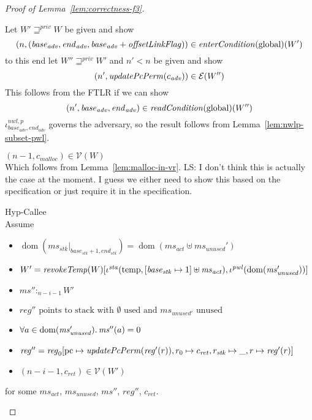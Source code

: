 \documentclass[a4paper]{article}
\DeclareMathOperator{\dom}{dom}
\newcommand\lau[1]{{\color{purple} \sf \footnotesize {LS: #1}}\\}
\newcommand{\var}[1]{\mathit{#1}}
\newcommand{\hs}{\var{ms}}
\newcommand{\ms}{\hs}
\newcommand{\pcreg}{\mathrm{pc}}
\newcommand{\start}{\var{base}}
\newcommand{\addrend}{\var{end}}
\newcommand{\reg}{\var{reg}}
\newcommand{\heap}{\var{mem}}
\newcommand{\adv}{\var{adv}}
\newcommand{\stk}{\var{stk}}
\newcommand{\nwl}{\var{nwl}}
\newcommand{\pwl}{\var{pwl}}
\newcommand{\sta}{\var{sta}}
\newcommand{\olf}{\var{offsetLinkFlag}}
\newcommand{\plainfun}[2]{
  \ifthenelse{\equal{#2}{}}
  {\mathit{#1}}
  {\mathit{#1}(#2)}
}
\newcommand{\updatePcPerm}[1]{\plainfun{updatePcPerm}{#1}}
\newcommand{\readCond}[1]{\plainfun{readCondition}{#1}}
\newcommand{\entryCond}[1]{\plainfun{enterCondition}{#1}}
\newcommand{\revokeTemp}[1]{\plainfun{revokeTemp}{#1}}
\newcommand{\futurestr}{\mathbin{\sqsupseteq}^{\var{priv}}}
\newcommand{\heapSat}[3][\heap]{#1 :_{#2} #3}
\newcommand{\memSat}[3][n]{\heapSat[#2]{#1}{#3}}
\newcommand{\codelabel}[1]{\mathit{#1}}
\newcommand{\malloc}{\codelabel{malloc}}
\newcommand{\asmType}{\plaindom{AsmType}}
\newcommand{\plaindom}[1]{\mathrm{#1}}
\newcommand{\intr}[2]{\mathcal{#1}}
\newcommand{\valueintr}[1]{\intr{V}{#1}}
\newcommand{\exprintr}[1]{\intr{E}{#1}}
\newcommand{\stdvr}{\valueintr{\asmType}}
\newcommand{\stder}{\exprintr{\asmType}}
\newcommand{\npair}[2][n]{\left(#1,#2 \right)}
\newcommand{\plainperm}[1]{\mathrm{#1}}
\newcommand{\glob}{\plainperm{global}}
\newcommand{\plainview}[1]{\mathrm{#1}}
\newcommand{\temp}{\plainview{temp}}
\begin{document}
\begin{proof}[Proof of Lemma~\ref{lem:correctness-f3}]
\begin{enumproof}
\begin{enumproof}
\begin{enumproof}
            Let $W' \futurestr W$ be given and show
            \[
              \npair{(\start_\adv,\addrend_\adv,\start_\adv+\olf)} \in \entryCond{}(\glob)(W')
            \]
            to this end let $W'' \futurestr W'$ and $n' < n$ be given and show
            \[
              \npair[n']{\updatePcPerm{c_\adv}} \in \stder(W'')
            \]
            This follows from the FTLR if we can show
            \[
              \npair[n']{\start_\adv,\addrend_\adv} \in \readCond{}(\glob)(W'')
            \]
            $\iota^{\nwl,p}_{\start_\adv,\addrend_\adv}$ governs the adversary, so the result follows from Lemma~\ref{lem:nwlp-subset-pwl}.
          \item $\npair[n-1]{c_\malloc} \in \stdvr(W)$\\
            Which follows from Lemma~\ref{lem:malloc-in-vr}.
            \lau{I don't think this is actually the case at the moment. I guess we either need to show this based on the specification or just require it in the specification.}
        \end{enumproof}
    \end{enumproof}
  \item Hyp-Callee\\
    Assume
    \begin{itemize}
    \item $\dom(\ms_\stk |_{\start_\stk+1,\addrend_\stk}) = \dom(\ms_{\mathit{act}} \uplus \ms_{\mathit{unused}}')$
    \item $W' = \revokeTemp{W}[\iota^{\sta}(\temp,[\start_\stk \mapsto 1]\uplus\ms_{\mathit{act}}),\iota^{\pwl}(\dom(\ms_{\mathit{unused}}'))]$
    \item $\memSat[n-i-1]{\ms''}{W'}$
    \item $\reg'' \text{ points to stack with $\emptyset$ used and $\ms_{\mathit{unused}'}$ unused}$
    \item $\forall a \in \dom(\ms_{\var{unused}}') \ldotp \ms''(a) = 0$
    \item $\reg''= \reg_0[\pcreg\mapsto\updatePcPerm{\reg'(r)},r_0 \mapsto c_{\mathit{ret}}, r_\stk \mapsto \_, r \mapsto \reg'(r)]$ 
    \item $\npair[n-i-1]{c_{\mathit{ret}}} \in \stdvr(W')$
    \end{itemize}
    for some $\ms_{\mathit{act}}$, $\ms_{\mathit{unused}}$, $\ms''$, $\reg''$, $c_{\mathit{ret}}$.
    

\end{enumproof}
\end{proof}
\end{document}
